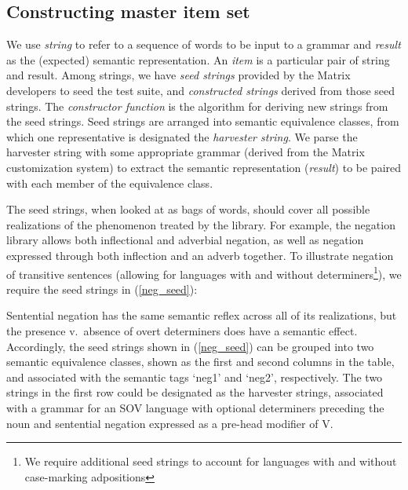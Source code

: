 \documentclass[11pt]{article}
\begin{document}
\subsection{Constructing master item set}

We use {\it string} to refer to a sequence of words to be input to a
grammar and {\it result} as the (expected) semantic representation.
An {\it item} is a particular pair of string and result.  Among
strings, we have {\it seed strings} provided by the Matrix developers
to seed the test suite, and {\it constructed strings} derived from
those seed strings.  The {\it constructor function} is the algorithm
for deriving new strings from the seed strings. Seed strings are
arranged into semantic equivalence classes, from which one
representative is designated the {\it harvester string}.  We parse the
harvester string with some appropriate grammar (derived from the
Matrix customization system) to extract the semantic representation
({\it result}) to be paired with each member of the equivalence class.

The seed strings, when looked at as bags of words, should cover all
possible realizations of the phenomenon treated by the library. For
example, the negation library allows both inflectional and adverbial
negation, as well as negation expressed through both inflection and an
adverb together.  To illustrate negation of transitive sentences
(allowing for languages with and without determiners\footnote{We
require additional seed strings to account for languages with and
without case-marking adpositions}), we require the seed strings in
(\ref{neg_seed}):

%
Sentential negation has the same semantic reflex across all
of its realizations, but the presence v.\ absence of overt determiners
does have a semantic effect.  Accordingly, the seed strings shown in
(\ref{neg_seed}) can be grouped into two semantic equivalence classes,
shown as the first and second columns in the table, and associated with
the semantic tags `neg1' and `neg2', respectively.  The two strings
in the first row could be designated as the harvester strings, associated
with a grammar for an SOV language with optional determiners preceding
the noun and sentential negation expressed as a pre-head modifier of V.
\end{document}
